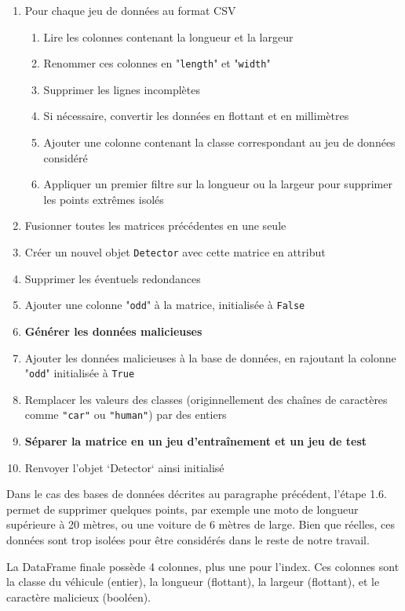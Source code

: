 \documentclass[a4paper]{report}
\begin{document}
\begin{enumerate}
\item Pour chaque jeu de données au format CSV
\begin{enumerate}[{1.}1.]
\item Lire les colonnes contenant la longueur et la largeur
\item Renommer ces colonnes en "\texttt{length}" et "\texttt{width}"
\item Supprimer les lignes incomplètes
\item Si nécessaire, convertir les données en flottant et en millimètres
\item Ajouter une colonne contenant la classe correspondant au jeu de données considéré
\item Appliquer un premier filtre sur la longueur ou la largeur pour supprimer les points extrêmes isolés
\end{enumerate}
\item Fusionner toutes les matrices précédentes en une seule
\item Créer un nouvel objet \texttt{Detector} avec cette matrice en attribut
\item Supprimer les éventuels redondances
\item Ajouter une colonne "\texttt{odd}" à la matrice, initialisée à \texttt{False}
\item \textbf{Générer les données malicieuses}
\item Ajouter les données malicieuses à la base de données, en rajoutant la colonne "\texttt{odd}" initialisée à \texttt{True}
\item Remplacer les valeurs des classes (originnellement des chaînes de caractères comme \texttt{"car"} ou \texttt{"human"}) par des entiers
\item \textbf{Séparer la matrice en un jeu d'entraînement et un jeu de test}
\item Renvoyer l'objet `Detector` ainsi initialisé
\end{enumerate}

Dans le cas des bases de données décrites au paragraphe précédent, l'étape 1.6. permet de supprimer quelques points, par exemple une moto de longueur supérieure à 20 mètres, ou une voiture de 6 mètres de large. Bien que réelles, ces données sont trop isolées pour être considérés dans le reste de notre travail.

La DataFrame finale possède 4 colonnes, plus une pour l'index. Ces colonnes sont la classe du véhicule (entier), la longueur (flottant), la largeur (flottant), et le caractère malicieux (booléen).
\end{document}
